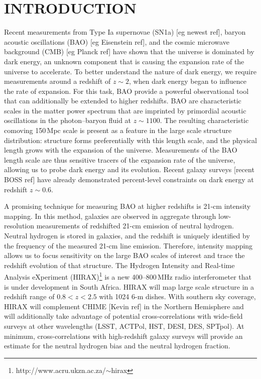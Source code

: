 \documentclass[]{spie}  %
\begin{document}
\section{INTRODUCTION}
\label{sec:intro}  %

Recent measurements from Type Ia supernovae (SN1a) [eg newest ref], baryon acoustic oscillations (BAO) [eg Eisenstein ref], and the cosmic microwave background (CMB) [eg Planck ref] have shown that the universe is dominated by dark energy, an unknown component that is causing the expansion rate of the universe to accelerate. To better understand the nature of dark energy, we require measurements around a redshift of $z\sim2$, when dark energy began to influence the rate of expansion.  For this task, BAO provide a powerful observational tool that can additionally be extended to higher redshifts.  BAO are characteristic scales in the matter power spectrum that are imprinted by primordial acoustic oscillations in the photon--baryon fluid at $z\sim 1100$.  The resulting characteristic comoving 150\,Mpc scale is present as a feature in the large scale structure distribution: structure forms preferentially with this length scale, and the physical length grows with the expansion of the universe. Measurements of the BAO length scale are thus sensitive tracers of the expansion rate of the universe, allowing us to probe dark energy and its evolution.  Recent galaxy surveys [recent BOSS ref] have already demonstrated percent-level constraints on dark energy at redshift $z\sim0.6$. \newline

A promising technique for measuring BAO at higher redshifts is 21-cm intensity mapping.  In this method, galaxies are observed in aggregate through low-resolution measurements of redshifted 21-cm emission of neutral hydrogen.  Neutral hydrogen is stored in galaxies, and the redshift is uniquely identified by the frequency of the measured 21-cm line emission.  Therefore, intensity mapping allows us to focus sensitivity on the large BAO scales of interest and trace the redshift evolution of that structure. The Hydrogen Intensity and Real-time Analysis eXperiment (HIRAX)\footnote{http:\//\//www.acru.ukzn.ac.za\//$\sim$hirax} is a new 400--800\,MHz radio interferometer that is under development in South Africa. HIRAX will map large scale structure in a redshift range of $0.8 < z < 2.5$ with 1024 6-m dishes. With southern sky coverage, HIRAX will complement CHIME [Kevin ref] in the Northern Hemisphere
and will additionally take advantage of potential cross-correlations with wide-field surveys at other wavelengths (LSST, ACTPol, HST, DESI, DES, SPTpol). At minimum, cross-correlations with high-redshift galaxy surveys will provide an estimate for the neutral hydrogen bias and the neutral hydrogen fraction.
\end{document}
